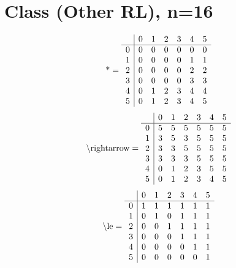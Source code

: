\documentclass[11pt]{article}
\begin{document}
\section{Class (Other RL), n=16}
\[\text{*} = 
\begin{array}{r | r r r r r r}
 & 0 & 1 & 2 & 3 & 4 & 5 \\ \hline
0 & 0 & 0 & 0 & 0 & 0 & 0 \\
1 & 0 & 0 & 0 & 0 & 1 & 1 \\
2 & 0 & 0 & 0 & 0 & 2 & 2 \\
3 & 0 & 0 & 0 & 0 & 3 & 3 \\
4 & 0 & 1 & 2 & 3 & 4 & 4 \\
5 & 0 & 1 & 2 & 3 & 4 & 5 \\
\end{array}
\]
\[\text{\textbackslash rightarrow} = 
\begin{array}{r | r r r r r r}
 & 0 & 1 & 2 & 3 & 4 & 5 \\ \hline
0 & 5 & 5 & 5 & 5 & 5 & 5 \\
1 & 3 & 5 & 3 & 5 & 5 & 5 \\
2 & 3 & 3 & 5 & 5 & 5 & 5 \\
3 & 3 & 3 & 3 & 5 & 5 & 5 \\
4 & 0 & 1 & 2 & 3 & 5 & 5 \\
5 & 0 & 1 & 2 & 3 & 4 & 5 \\
\end{array}
\]
\[\text{\textbackslash le} = 
\begin{array}{r | r r r r r r}
 & 0 & 1 & 2 & 3 & 4 & 5 \\ \hline
0 & 1 & 1 & 1 & 1 & 1 & 1 \\
1 & 0 & 1 & 0 & 1 & 1 & 1 \\
2 & 0 & 0 & 1 & 1 & 1 & 1 \\
3 & 0 & 0 & 0 & 1 & 1 & 1 \\
4 & 0 & 0 & 0 & 0 & 1 & 1 \\
5 & 0 & 0 & 0 & 0 & 0 & 1 \\
\end{array}
\]
\end{document}
